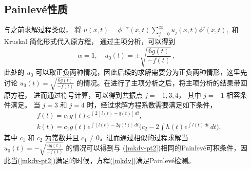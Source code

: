 \subsection{Painlev\'{e}性质}
与之前求解过程类似，
将 $u(x,t)=\phi^{-\alpha}(x,t)\sum\limits_{j=0}^{\infty}u_j(x,t)\phi^{j}(x,t),\label{mkdv-equ_1}$
和 Kruskal 简化形式代入原方程，
通过主项分析，可以得到
\begin{equation}
\alpha=1,\quad u_0(t)=\pm  \sqrt{\frac{6g(t)}{-f(t)}}  \, ,
\end{equation}
此处的 $u_0$ 可以取正负两种情况，因此后续的求解需要分为正负两种情形，这里先讨论 $u_0(t)=  \sqrt{\frac{6g(t)}{-f(t)}}$ 的情况。在进行了主项分析之后，将主项分析的结果带回原方程，
进而通过符号计算，可以得到共振点 $j= -1, 3, 4$， 其中 $j = -1$ 相容条件满足。 当 $j = 3$ 和 $j = 4$ 时，经过求解方程系数需要满足如下条件，
\begin{align}
& f(t)=c_1 g(t) e^{\int 2[\,l(t)- q(t)] \, dt}\label{mkdv-pt1},\\
& k(t)=c_1  g(t) e^{\int [l(t)-2 q(t)] \, dt}\big(c_2-2  \int \!h(t) e^{\int l(t) \, dt} \, dt \big),
\label{mkdv-pt2}
\end{align}
其中 $c_1$ 和 $c_2$ 为常数并且 $c_1\neq 0$。进而通过相似的过程求解当 $u_0(t)=  -\sqrt{\frac{6g(t)}{-f(t)}}$ 的情况可以得到与 (\ref{mkdv-pt2})相同的Painlev\'{e}可积条件，因此当(\ref{mkdv-pt2})满足的时候，方程(\ref{mkdv})满足Painlev\'{e}检测。
